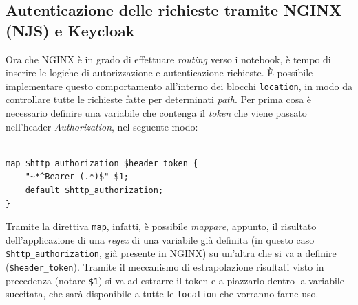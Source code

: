 \subsection{Autenticazione delle richieste tramite NGINX (NJS) e Keycloak}
Ora che NGINX è in grado di effettuare \textit{routing} verso i notebook, è tempo di inserire le logiche di autorizzazione e autenticazione richieste. È possibile implementare questo comportamento all'interno dei blocchi \verb|location|, in modo da controllare tutte le richieste fatte per determinati \textit{path}.
\newline
Per prima cosa è necessario definire una variabile che contenga il \textit{token} che viene passato nell'header \textit{Authorization}, nel seguente modo:
\begin{verbatim}

map $http_authorization $header_token {
    "~*^Bearer (.*)$" $1;
    default $http_authorization;
}

\end{verbatim}
Tramite la direttiva \verb|map|, infatti, è possibile \textit{mappare}, appunto, il risultato dell'applicazione di una \textit{regex} di una variabile già definita (in questo caso \verb|$http_authorization|, già presente in NGINX) su un'altra che si va a definire (\verb|$header_token|).
\newline
Tramite il meccanismo di estrapolazione risultati visto in precedenza (notare \verb|$1|) si va ad estrarre il token e a piazzarlo dentro la variabile succitata, che sarà disponibile a tutte le \verb|location| che vorranno farne uso.
